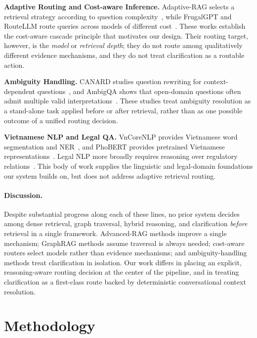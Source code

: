 ﻿\documentclass[11pt,twocolumn]{article}
\begin{document}
\textbf{Adaptive Routing and Cost-aware Inference.}
Adaptive-RAG selects a retrieval strategy according to question
complexity~\cite{jeong2024adaptive}, while FrugalGPT and RouteLLM route
queries across models of different
cost~\cite{chen2023frugalgpt,ong2024routellm}. These works establish the
cost-aware cascade principle that motivates our design. Their routing
target, however, is the \emph{model} or \emph{retrieval depth}; they do
not route among qualitatively different evidence mechanisms, and they do
not treat clarification as a routable action.

\textbf{Ambiguity Handling.}
CANARD studies question rewriting for context-dependent
questions~\cite{elgohary2019canard}, and AmbigQA shows that open-domain
questions often admit multiple valid
interpretations~\cite{min2020ambigqa}. These studies treat ambiguity
resolution as a stand-alone task applied before or after retrieval, rather
than as one possible outcome of a unified routing decision.

\textbf{Vietnamese NLP and Legal QA.}
VnCoreNLP provides Vietnamese word segmentation and
NER~\cite{vu2018vncorenlp}, and PhoBERT provides pretrained Vietnamese
representations~\cite{nguyen2020phobert}. Legal NLP more broadly requires
reasoning over regulatory
relations~\cite{chalkidis2020legalbert,zhong2020nlp_law,guha2023legalbench,louis2024interpretable}.
This body of work supplies the linguistic and legal-domain foundations our
system builds on, but does not address adaptive retrieval routing.

\paragraph{Discussion.}
Despite substantial progress along each of these lines, no prior system
decides among dense retrieval, graph traversal, hybrid reasoning, and
clarification \emph{before} retrieval in a single framework. Advanced-RAG
methods improve a single mechanism; GraphRAG methods assume traversal is
always needed; cost-aware routers select models rather than evidence
mechanisms; and ambiguity-handling methods treat clarification in
isolation. Our work differs in placing an explicit, reasoning-aware
routing decision at the center of the pipeline, and in treating
clarification as a first-class route backed by deterministic
conversational context resolution.
\FloatBarrier

\section{Methodology}
\label{sec:methodology}
\end{document}
